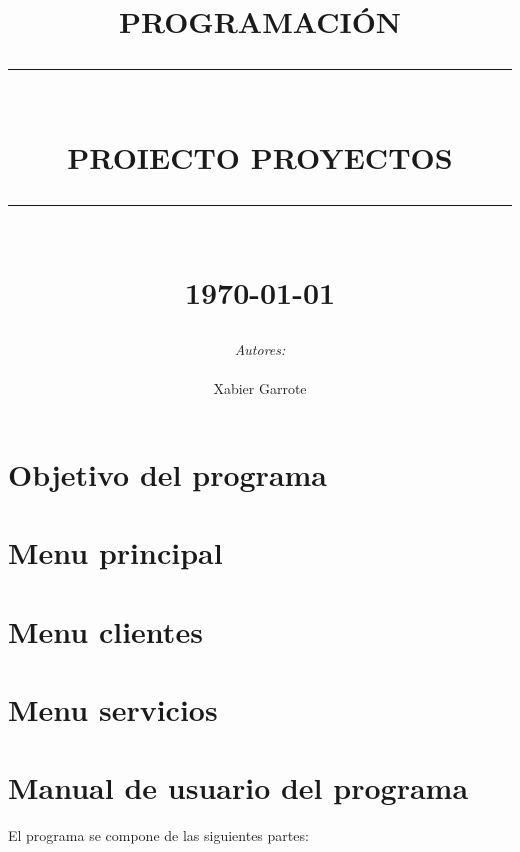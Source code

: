 \documentclass[12pt]{article}
\newcommand{\HRule}[1]{\rule{\linewidth}{#1}}
\begin{document}
\title{ \normalsize \textsc{PROGRAMACIÓN}
		\\ [2.0cm]
		\HRule{2pt} \\
		\LARGE \textbf{\uppercase{Proiecto Proyectos}}
		\HRule{2pt} \\ [0.5cm] \bigskip
		\normalsize \today \vspace*{1\baselineskip}}

\date{}

\author{
        \emph{Autores:} \\ \\
		Xabier Garrote }

\maketitle
\newpage
\tableofcontents
\newpage


\section{Objetivo del programa}
\section{Menu principal}
\section{Menu clientes}
\section{Menu servicios}
\section{Manual de usuario del programa}
El programa se compone de las siguientes partes:
\end{document}
